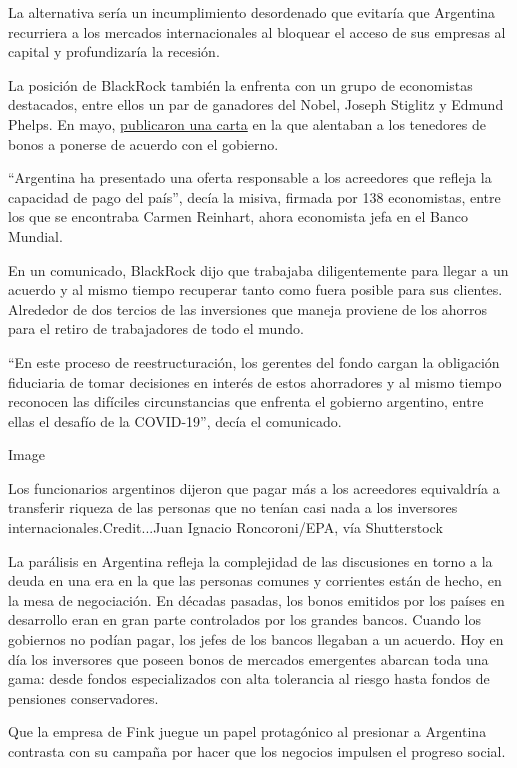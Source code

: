 La alternativa sería un incumplimiento desordenado que evitaría que
Argentina recurriera a los mercados internacionales al bloquear el
acceso de sus empresas al capital y profundizaría la recesión.

La posición de BlackRock también la enfrenta con un grupo de economistas
destacados, entre ellos un par de ganadores del Nobel, Joseph Stiglitz y
Edmund Phelps. En mayo,
\href{https://lta.reuters.com/articulo/finanzas-argentina-stiglitz-idLTAKBN22I25L-OUSLT}{publicaron
una carta} en la que alentaban a los tenedores de bonos a ponerse de
acuerdo con el gobierno.

``Argentina ha presentado una oferta responsable a los acreedores que
refleja la capacidad de pago del país'', decía la misiva, firmada por
138 economistas, entre los que se encontraba Carmen Reinhart, ahora
economista jefa en el Banco Mundial.

En un comunicado, BlackRock dijo que trabajaba diligentemente para
llegar a un acuerdo y al mismo tiempo recuperar tanto como fuera posible
para sus clientes. Alrededor de dos tercios de las inversiones que
maneja proviene de los ahorros para el retiro de trabajadores de todo el
mundo.

``En este proceso de reestructuración, los gerentes del fondo cargan la
obligación fiduciaria de tomar decisiones en interés de estos
ahorradores y al mismo tiempo reconocen las difíciles circunstancias que
enfrenta el gobierno argentino, entre ellas el desafío de la COVID-19'',
decía el comunicado.

Image

Los funcionarios argentinos dijeron que pagar más a los acreedores
equivaldría a transferir riqueza de las personas que no tenían casi nada
a los inversores internacionales.Credit...Juan Ignacio Roncoroni/EPA,
vía Shutterstock

La parálisis en Argentina refleja la complejidad de las discusiones en
torno a la deuda en una era en la que las personas comunes y corrientes
están de hecho, en la mesa de negociación. En décadas pasadas, los bonos
emitidos por los países en desarrollo eran en gran parte controlados por
los grandes bancos. Cuando los gobiernos no podían pagar, los jefes de
los bancos llegaban a un acuerdo. Hoy en día los inversores que poseen
bonos de mercados emergentes abarcan toda una gama: desde fondos
especializados con alta tolerancia al riesgo hasta fondos de pensiones
conservadores.

Que la empresa de Fink juegue un papel protagónico al presionar a
Argentina contrasta con su campaña por hacer que los negocios impulsen
el progreso social.

